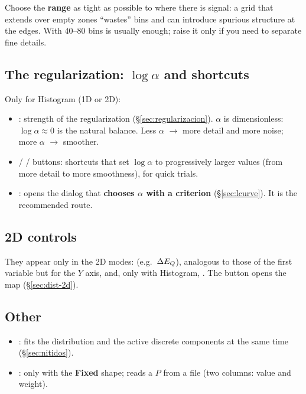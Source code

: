 \begin{truco}
Choose the \textbf{range} as tight as possible to where there is signal: a grid that
extends over empty zones ``wastes'' bins and can introduce spurious structure at the
edges. With $40$--$80$ bins is usually enough; raise it only if you need to separate
fine details.
\end{truco}

\subsection{The regularization: $\log\alpha$ and shortcuts}

Only for Histogram (1D or 2D):

\begin{itemize}[nosep]
  \item {}: strength of the regularization
        (\S\ref{sec:regularizacion}). $\alpha$ is dimensionless: $\log\alpha
        \approx 0$ is the natural balance. Less $\alpha$ $\to$ more detail and more
        noise; more $\alpha$ $\to$ smoother.
  \item {} /  /  buttons: shortcuts that set
        $\log\alpha$ to progressively larger values (from more detail to more
        smoothness), for quick trials.
  \item {}: opens the dialog that \textbf{chooses $\alpha$ with
        a criterion} (\S\ref{sec:lcurve}). It is the recommended route.
\end{itemize}

\subsection{2D controls}

They appear only in the 2D modes: 
(e.g.\ $\Delta E_{Q}$), analogous to those of the first variable but for the $Y$ axis, and,
only with Histogram, . The  button opens the
map (\S\ref{sec:dist-2d}).

\subsection{Other}

\begin{itemize}[nosep]
  \item {}: fits the distribution and the active
        discrete components at the same time (\S\ref{sec:nitidos}).
  \item {}: only with the \textbf{Fixed} shape; reads a $P$ from a
        file (two columns: value and weight).
\end{itemize}

